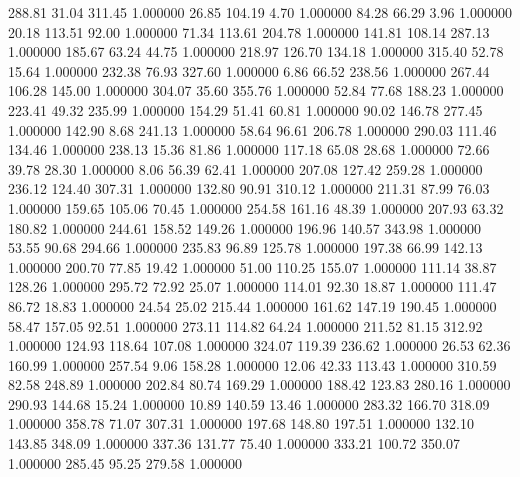     288.81     31.04    311.45  1.000000
     26.85    104.19      4.70  1.000000
     84.28     66.29      3.96  1.000000
     20.18    113.51     92.00  1.000000
     71.34    113.61    204.78  1.000000
    141.81    108.14    287.13  1.000000
    185.67     63.24     44.75  1.000000
    218.97    126.70    134.18  1.000000
    315.40     52.78     15.64  1.000000
    232.38     76.93    327.60  1.000000
      6.86     66.52    238.56  1.000000
    267.44    106.28    145.00  1.000000
    304.07     35.60    355.76  1.000000
     52.84     77.68    188.23  1.000000
    223.41     49.32    235.99  1.000000
    154.29     51.41     60.81  1.000000
     90.02    146.78    277.45  1.000000
    142.90      8.68    241.13  1.000000
     58.64     96.61    206.78  1.000000
    290.03    111.46    134.46  1.000000
    238.13     15.36     81.86  1.000000
    117.18     65.08     28.68  1.000000
     72.66     39.78     28.30  1.000000
      8.06     56.39     62.41  1.000000
    207.08    127.42    259.28  1.000000
    236.12    124.40    307.31  1.000000
    132.80     90.91    310.12  1.000000
    211.31     87.99     76.03  1.000000
    159.65    105.06     70.45  1.000000
    254.58    161.16     48.39  1.000000
    207.93     63.32    180.82  1.000000
    244.61    158.52    149.26  1.000000
    196.96    140.57    343.98  1.000000
     53.55     90.68    294.66  1.000000
    235.83     96.89    125.78  1.000000
    197.38     66.99    142.13  1.000000
    200.70     77.85     19.42  1.000000
     51.00    110.25    155.07  1.000000
    111.14     38.87    128.26  1.000000
    295.72     72.92     25.07  1.000000
    114.01     92.30     18.87  1.000000
    111.47     86.72     18.83  1.000000
     24.54     25.02    215.44  1.000000
    161.62    147.19    190.45  1.000000
     58.47    157.05     92.51  1.000000
    273.11    114.82     64.24  1.000000
    211.52     81.15    312.92  1.000000
    124.93    118.64    107.08  1.000000
    324.07    119.39    236.62  1.000000
     26.53     62.36    160.99  1.000000
    257.54      9.06    158.28  1.000000
     12.06     42.33    113.43  1.000000
    310.59     82.58    248.89  1.000000
    202.84     80.74    169.29  1.000000
    188.42    123.83    280.16  1.000000
    290.93    144.68     15.24  1.000000
     10.89    140.59     13.46  1.000000
    283.32    166.70    318.09  1.000000
    358.78     71.07    307.31  1.000000
    197.68    148.80    197.51  1.000000
    132.10    143.85    348.09  1.000000
    337.36    131.77     75.40  1.000000
    333.21    100.72    350.07  1.000000
    285.45     95.25    279.58  1.000000
